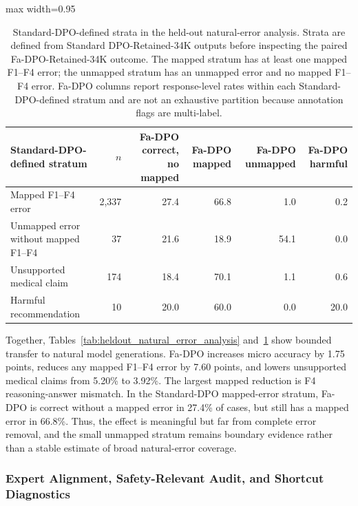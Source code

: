 \documentclass[a4paper,fleqn,doubleblind]{cas-sc}
\begin{document}
\begin{table}[htbp]
    \centering
    \footnotesize
    \caption{Standard-DPO-defined strata in the held-out natural-error analysis. Strata are defined from Standard DPO-Retained-34K outputs before inspecting the paired Fa-DPO-Retained-34K outcome. The mapped stratum has at least one mapped F1--F4 error; the unmapped stratum has an unmapped error and no mapped F1--F4 error. Fa-DPO columns report response-level rates within each Standard-DPO-defined stratum and are not an exhaustive partition because annotation flags are multi-label.}
    \label{tab:heldout_natural_standard_strata}
    \begin{adjustbox}{max width=0.95\textwidth}
    \begin{tabular}{lrrrrr}
        \toprule
        \textbf{Standard-DPO-defined stratum} & \textbf{$n$} & \textbf{Fa-DPO correct, no mapped} & \textbf{Fa-DPO mapped} & \textbf{Fa-DPO unmapped} & \textbf{Fa-DPO harmful} \\
        \midrule
        Mapped F1--F4 error & 2,337 & 27.4 & 66.8 & 1.0 & 0.2 \\
        Unmapped error without mapped F1--F4 & 37 & 21.6 & 18.9 & 54.1 & 0.0 \\
        Unsupported medical claim & 174 & 18.4 & 70.1 & 1.1 & 0.6 \\
        Harmful recommendation & 10 & 20.0 & 60.0 & 0.0 & 20.0 \\
        \bottomrule
    \end{tabular}
    \end{adjustbox}
\end{table}

Together, Tables~\ref{tab:heldout_natural_error_analysis} and~\ref{tab:heldout_natural_standard_strata} show bounded transfer to natural model generations. Fa-DPO increases micro accuracy by 1.75 points, reduces any mapped F1--F4 error by 7.60 points, and lowers unsupported medical claims from 5.20\% to 3.92\%. The largest mapped reduction is F4 reasoning-answer mismatch. In the Standard-DPO mapped-error stratum, Fa-DPO is correct without a mapped error in 27.4\% of cases, but still has a mapped error in 66.8\%. Thus, the effect is meaningful but far from complete error removal, and the small unmapped stratum remains boundary evidence rather than a stable estimate of broad natural-error coverage.

\subsubsection{Expert Alignment, Safety-Relevant Audit, and Shortcut Diagnostics}
\label{subsec:human_alignment}
\label{subsec:harm_severity_audit}
\label{subsec:answer_shortcut_diagnostic}
\end{document}
